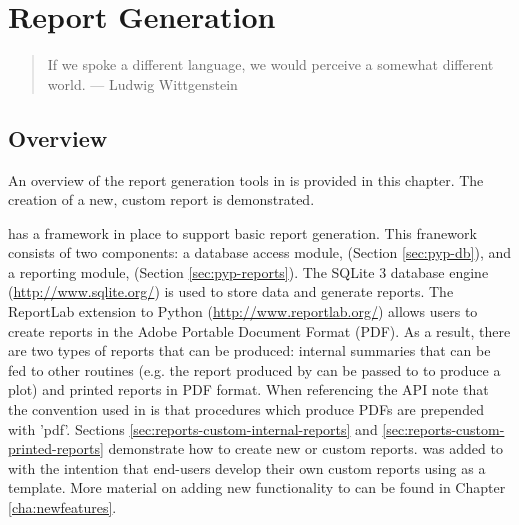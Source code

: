 \chapter{Report Generation}
\label{cha:reports}
\begin{quote}
If we spoke a different language, we would perceive a somewhat different world. --- Ludwig Wittgenstein
\end{quote}
\section{Overview}\label{sec:reports-overview}
An overview of the report generation tools in \PyPedal{} is provided in this chapter.  The creation of a new, custom report is demonstrated.

\PyPedal{} has a framework in place to support basic report generation.  This franework consists of two components: a database access module,  (Section \ref{sec:pyp-db}), and a reporting module,  (Section \ref{sec:pyp-reports}).  The SQLite 3 database engine (\url{http://www.sqlite.org/}) is used to store data and generate reports.  The ReportLab extension to Python (\url{http://www.reportlab.org/}) allows users to create reports in the Adobe Portable Document Format (PDF).  As a result, there are two types of reports that can be produced: internal summaries that can be fed to other \PyPedal{} routines (e.g. the report produced by  can be passed to  to produce a plot) and printed reports in PDF format.  When referencing the  API note that the convention used in \PyPedal{} is that procedures which produce PDFs are prepended with 'pdf'.  Sections \ref{sec:reports-custom-internal-reports} and \ref{sec:reports-custom-printed-reports} demonstrate how to create new or custom reports.   was added to \PyPedal{} with the intention that end-users develop their own custom reports using  as a template.  More material on adding new functionality to \PyPedal{} can be found in Chapter \ref{cha:newfeatures}.

